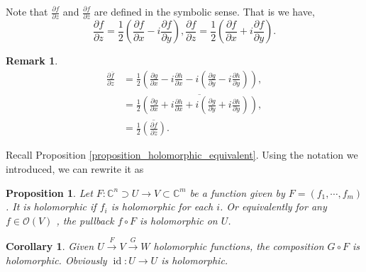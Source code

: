 \documentclass{article}
\newtheorem{proposition}{Proposition}[section]
\newtheorem{remark}{Remark}[section]
\newtheorem{corollary}{Corollary} [section]
\DeclareMathOperator{\id}{id}
\newcommand{\C}[0]{\mathbb{C}}
\newcommand{\pd}[2]{{\frac {\partial#1} {\partial#2}}}
\begin{document}
Note that $\pd{f}{z}$ and $\pd{f}{\overline{z}}$ are defined in the symbolic sense. That is we have,
\begin{equation*}
  \pd{f}{z} = {\frac 1 2}\left(\pd{f}{x}-i\pd{f}{y}\right),\pd{f}{z} = {\frac 1 2}\left(\pd{f}{x}+i\pd{f}{y}\right).
\end{equation*}

\begin{remark}
  \begin{align*}
    \pd{\overline{f}}{z} & = {\frac 1 2}\left(\pd{g}{x}-i\pd{h}{x}-i\left(\pd{g}{y}-i\pd{h}{y}\right)\right),\\
    & = {\frac 1 2}\overline{\left(\pd{g}{x}+i\pd{h}{x}+i\left(\pd{g}{y}+i\pd{h}{y}\right)\right)},\\
    & = {\frac 1 2}\overline{\left(\pd{f}{\overline{z}}\right)}.
  \end{align*}
  \label{remark_conjugate_derivative}
\end{remark}

Recall Proposition \ref{proposition_holomorphic_equivalent}. Using the notation we introduced, we can rewrite it as 

\begin{proposition}
Let $F:\C^n\supset U\to V\subset \C^m$ be a function given by $F=(f_1,\cdots,f_m)$. It is holomorphic if $f_i$ is holomorphic for each $i$. Or equivalently for any $f\in\mathcal{O}(V)$ , the pullback $f\circ F$ is holomorphic on $U$. 
\end{proposition}

\begin{corollary}
Given $U\stackrel{F}{\to}V\stackrel{G}{\to}W$ holomorphic functions, the composition $G\circ F$ is holomorphic. Obviously $\id:U\to U$ is holomorphic.
\end{corollary}
\end{document}
